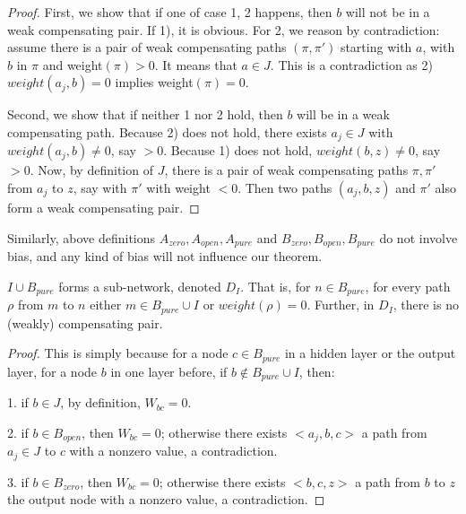 	
			
			\begin{proof}
				First, we show that if one of case 1, 2 happens, then $b$ will not be in a weak compensating pair. If 1), it is obvious. For 2, we reason by contradiction: assume there is a pair of weak compensating paths 	$(\pi,\pi')$ starting with $a$, with $b$ in $\pi$ and weight$(\pi) > 0$. It means that $a \in J$. This is a contradiction as 2) $weight({a_j,b})=0$ implies weight$(\pi)=0$.
				
				Second, we show that if neither 1 nor 2 hold, then $b$ will be in a weak compensating path.
				Because 2) does not hold, there exists $a_j \in J$ with $weight({a_j,b}) \neq 0$, say $>0$.
				Because 1) does not hold, $weight({b,z}) \neq 0$, say $>0$.
				Now, by definition of $J$, there is a pair of weak compensating paths $\pi,\pi'$ 
				from $a_j$ to $z$, say with $\pi'$ with weight $<0$.
				Then two paths $(a_j,b,z)$ and $\pi'$ also form a weak compensating pair.
			\end{proof}
			
							{ \color{red}	Similarly, above definitions $A_{zero},A_{open}, A_{pure}$ and $B_{zero},B_{open},B_{pure}$ do not involve bias, and any kind of bias will not influence our theorem.}
			
			\begin{lemma}\label{lem:subnetwork}
				$I \cup B_{pure} $ forms a sub-network, denoted $D_I$. That is, 
				for $n \in B_{pure}$, for every path $\rho$ from $m$ to $n$
				either $m \in B_{pure}\cup I$ or $weight(\rho)=0$.
				Further, in $D_I$, there is no (weakly) compensating pair.
			\end{lemma}

			

			
			\begin{proof}
				This is simply because for a node $c\in B_{pure}$ in a hidden layer or the output layer, for a node $b$ in one layer before, if $b\notin B_{pure}\cup I$, then:
				
				1. if $b\in J$, by definition, $W_{bc}=0$.
				
				2. if $b\in B_{open}$, then $W_{bc}=0$; otherwise there exists $<a_j,b,c>$ a path from $a_j\in J$ to $c$ with a nonzero value, a contradiction.
				
				3. if $b\in B_{zero}$, then $W_{bc}=0$; otherwise there exists $<b,c,z>$ a path from $b$ to $z$ the output node with a nonzero value, a contradiction. 
			\end{proof}
			
